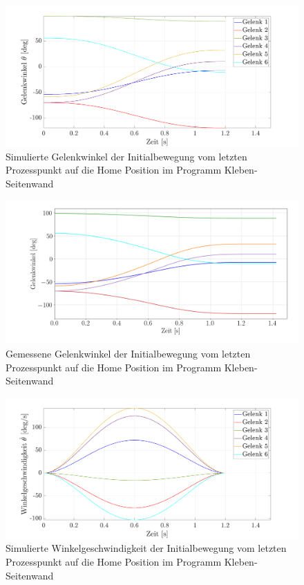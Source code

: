 \newpage
\begin{figure}[]
	\centering
	\includegraphics[width=1\linewidth]{images/posmat}
	\caption{Simulierte Gelenkwinkel  der Initialbewegung vom letzten Prozesspunkt auf die  Home Position im Programm Kleben-Seitenwand}
	\label{fig:gelenkwinkel}
\end{figure}
%
\begin{figure}[]
	\centering
	\includegraphics[width=1\linewidth]{images/pos}
	\caption{Gemessene Gelenkwinkel  der Initialbewegung vom letzten Prozesspunkt auf die  Home Position im Programm Kleben-Seitenwand}
	\label{fig:gelenkwinkelpy}
\end{figure}
%
\newpage
\begin{figure}[]
	\centering
	\includegraphics[width=1\linewidth]{images/velmat}
	\caption{Simulierte  Winkelgeschwindigkeit der Initialbewegung vom letzten Prozesspunkt auf die  Home Position im Programm Kleben-Seitenwand}
	\label{fig:winkelgeschwindigkeit}
\end{figure}
